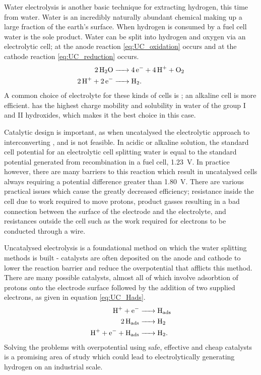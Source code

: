 Water electrolysis is another basic technique for extracting hydrogen, this time from water.
Water is an incredibly naturally abundant chemical making up a large fraction of the earth's surface.
When hydrogen is consumed by a fuel cell water is the sole product.
Water can be split into hydrogen and oxygen via an electrolytic cell; at the anode reaction \eqref{eq:UC_oxidation} occurs and at the cathode reaction \eqref{eq:UC_reduction} occurs.
\begin{align}
	\ce{2H2O &-> 4e- + 4H+ + O2} \label{eq:UC_oxidation} \\
	\ce{2H+ + 2e- &-> H2} \label{eq:UC_reduction}
.\end{align}
A common choice of electrolyte for these kinds of cells is ; an alkaline cell is more efficient\cite{merrill2006}.
 has the highest charge mobility and solubility in water of the group I and II hydroxides, which makes it the best choice in this case.

Catalytic design is important, as when uncatalysed the electrolytic approach to interconverting ,  and  is not feasible.
In acidic or alkaline solution, the standard cell potential for an electrolytic cell splitting water is equal to the standard potential generated from recombination in a fuel cell, \SI{1.23}{\volt}\cite{Peng2020}.
In practice however, there are many barriers to this reaction which result in uncatalysed cells always requiring a potential difference greater than \SI{1.80}{\volt}.
There are various practical issues which cause the greatly decreased efficiency; resistance inside the cell due to work required to move protons, product gasses resulting in a bad connection between the surface of the electrode and the electrolyte, and resistances outside the cell such as the work required for electrons to be conducted through a wire.

Uncatalysed electrolysis is a foundational method on which the water splitting methods is built - catalysts are often deposited on the anode and cathode to lower the reaction barrier and reduce the overpotential that afflicts this method.
There are many possible catalysts, almost all of which involve adsorbtion of protons onto the electrode surface followed by the addition of two supplied electrons, as given in equation \eqref{eq:UC_Hads}\cite{Leonard2012}.
\begin{align}
	\ce{H+ + e- &-> H_{ads}}\\
	\ce{2H_{ads} &-> H2}\\
	\ce{H+ + e- + H_{ads} &-> H2} \label{eq:UC_Hads}
.\end{align}
Solving the problems with overpotential using safe, effective and cheap catalysts is a promising area of study which could lead to electrolytically generating hydrogen on an industrial scale.

